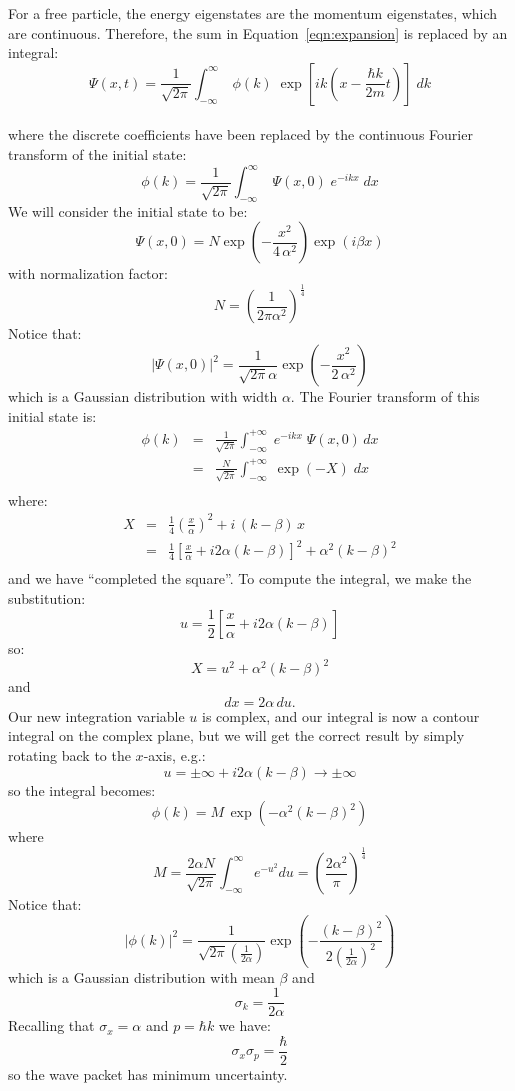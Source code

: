 \documentclass[12pt]{article}
\begin{document}
For a free particle, the energy eigenstates are the momentum
eigenstates, which are continuous.  Therefore, the sum in
Equation~\ref{eqn:expansion} is replaced by an integral:
\begin{equation}
\Psi(x,t) = \frac{1}{\sqrt{2\pi}} \int_{-\infty}^{\infty} \; \phi(k) \; \exp\left[ik\left(x-\frac{\hbar k}{2m}t\right)\right]\; dk 
\end{equation}\\[3pt]
where the discrete coefficients have been replaced by the continuous Fourier
transform of the initial state:
\begin{equation}
\phi(k) = \frac{1}{\sqrt{2\pi}} \int_{-\infty}^{\infty} \; \Psi(x,0) \; e^{-ikx} \; dx 
\end{equation}
We will consider the initial state to be:
\begin{equation}
\label{eqn:initial}
\Psi(x,0) = N \exp\left( -\frac{x^2}{4\,\alpha^2} \right) \exp(i\beta x)
\end{equation}
with normalization factor:
$$N = \left( \frac{1}{2 \pi \alpha^2} \right)^\frac{1}{4}$$
Notice that:
$$|\Psi(x,0)|^2 = \frac{1}{\sqrt{2\pi} \alpha} \exp\left( -\frac{x^2}{2\,\alpha^2} \right)$$
which is a Gaussian distribution with width $\alpha$.  The Fourier transform of this initial state is:
\begin{eqnarray*}
\phi(k) &=& \frac{1}{\sqrt{2\pi}} \int_{-\infty}^{+\infty} \; e^{-ikx} \; \Psi(x,0) \, dx \\
        &=& \frac{N}{\sqrt{2\pi}} \int_{-\infty}^{+\infty} \; \exp(-X) \; dx \\
\end{eqnarray*}
where:
\begin{eqnarray*}
  X &=& \frac{1}{4} \left( \frac{x}{\alpha} \right)^2 + i\,(k-\beta)\,x\\
    &=& \frac{1}{4} \left[ \frac{x}{\alpha}  + i 2 \alpha (k-\beta) \right]^2 + \alpha^2(k-\beta)^2\\
\end{eqnarray*}
and we have ``completed the square''.  To compute the integral, we make the substitution:
$$u = \frac{1}{2} \left[ \frac{x}{\alpha} + i 2 \alpha (k-\beta)\right]$$
so:
$$X = u^2 + \alpha^2 (k-\beta)^2$$
and
$$dx = 2 \alpha \, du.$$
Our new integration variable $u$ is complex, and our integral is now a
contour integral on the complex plane, but we will get the correct
result by simply rotating back to the $x$-axis, e.g.:
$$u = \pm\infty + i 2 \alpha (k-\beta) \to \pm\infty$$
so the integral becomes:
$$\phi(k) = M \, \exp(-\alpha^2(k-\beta)^2)$$
where
$$M = \frac{2 \alpha N}{\sqrt{2\pi}} \int_{-\infty}^{\infty} e^{-u^2} du = \left( \frac{2\alpha^2}{\pi} \right)^\frac{1}{4}$$
Notice that:
$$|\phi(k)|^2 = \frac{1}{\sqrt{2\pi} \left(\frac{1}{2 \alpha}\right)} \exp\left( -\frac{(k-\beta)^2}{2\left( \frac{1}{2 \alpha}\right)^2}\right)$$
which is a Gaussian distribution with mean $\beta$ and
$$\sigma_k = \frac{1}{2 \alpha}$$
Recalling that $\sigma_x = \alpha$ and $p =\hbar k$ we have:
$$\sigma_x \sigma_p = \frac{\hbar}{2}$$
so the wave packet has minimum uncertainty.
\end{document}

